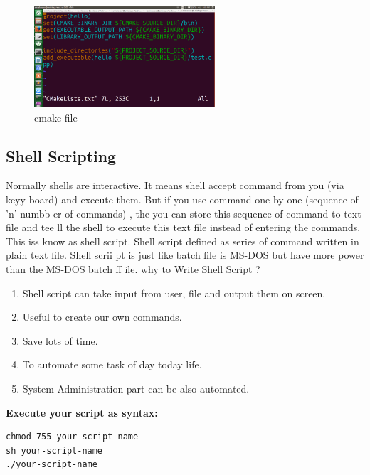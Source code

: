 \begin{figure}[!ht]
\centering
\includegraphics[width=0.6\textwidth]{input/images/cgs/cm.png}                   
\caption{cmake file}
\hspace{-1.5em}
\end{figure}

\subsection{Shell Scripting}
Normally shells are interactive. It means shell accept command from you (via keyy
board) and execute them. But if you use command one by one (sequence of 'n' numbb
er of commands) , the you can store this sequence of command to text file and tee
ll the shell to execute this text file instead of entering the commands. This iss
 know as shell script.
Shell script defined as series of command written in plain text file. Shell scrii
pt is just like batch file is MS-DOS but have more power than the MS-DOS batch ff
ile.
why to Write Shell Script ?
\begin{enumerate}
\item Shell script can take input from user, file and output them on screen.
\item Useful to create our own commands.
\item Save lots of time.
\item To automate some task of day today life.
\item System Administration part can be also automated.
\end{enumerate}
{ \bf Execute your script as syntax:}
\begin{verbatim}
chmod 755 your-script-name
sh your-script-name
./your-script-name
\end{verbatim}


